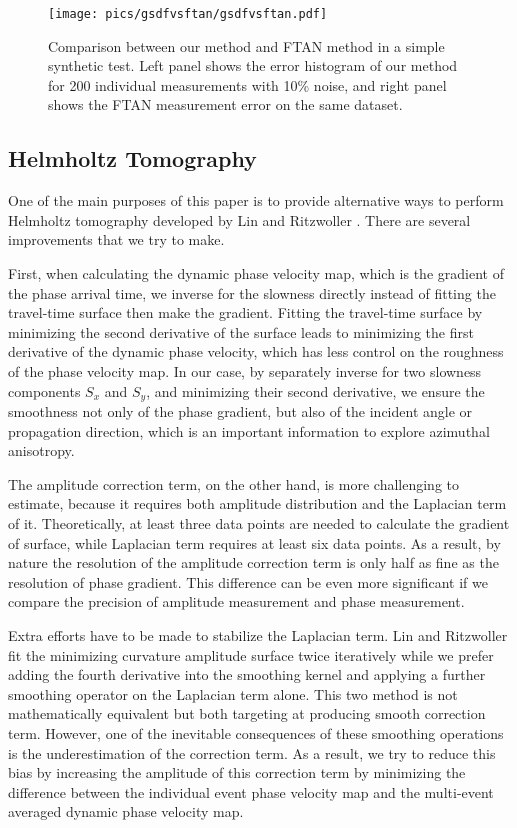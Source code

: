 \documentclass{gji}
\begin{document}
\begin{figure}
	\texttt{[image: pics/gsdfvsftan/gsdfvsftan.pdf]}
	\caption{Comparison between our method and FTAN method in a simple synthetic test. Left panel shows the error histogram of our method for 200 individual measurements with 10\% noise, and right panel shows the FTAN measurement error on the same dataset.}
	\label{fig:syntest}
\end{figure}

\subsection{Helmholtz Tomography}

One of the main purposes of this paper is to provide alternative ways to perform Helmholtz tomography developed by Lin and Ritzwoller . There are several improvements that we try to make. 

First, when calculating the dynamic phase velocity map, which is the gradient of the phase arrival time, we inverse for the slowness directly instead of fitting the travel-time surface then make the gradient. Fitting the travel-time surface by minimizing the second derivative of the surface leads to minimizing the first derivative of the dynamic phase velocity, which has less control on the roughness of the phase velocity map. In our case, by separately inverse for two slowness components $S_x$ and $S_y$, and minimizing their second derivative, we ensure the smoothness not only of the phase gradient, but also of the incident angle or propagation direction, which is an important information to explore azimuthal anisotropy. 

The amplitude correction term, on the other hand, is more challenging to estimate, because it requires both amplitude distribution and the Laplacian term of it. Theoretically, at least three data points are needed to calculate the gradient of surface, while Laplacian term requires at least six data points. As a result, by nature the resolution of the amplitude correction term is only half as fine as the resolution of phase gradient. This difference can be even more significant if we compare the precision of amplitude measurement and phase measurement. 

Extra efforts have to be made to stabilize the Laplacian term. Lin and Ritzwoller  fit the minimizing curvature amplitude surface twice iteratively while we prefer adding the fourth derivative into the smoothing kernel and applying a further smoothing operator on the Laplacian term alone. This two method is not mathematically equivalent but both targeting at producing smooth correction term. However, one of the inevitable consequences of these smoothing operations is the underestimation of the correction term. As a result, we try to reduce this bias by increasing the amplitude of this correction term by minimizing the difference between the individual event phase velocity map and the multi-event averaged dynamic phase velocity map.
\end{document}

